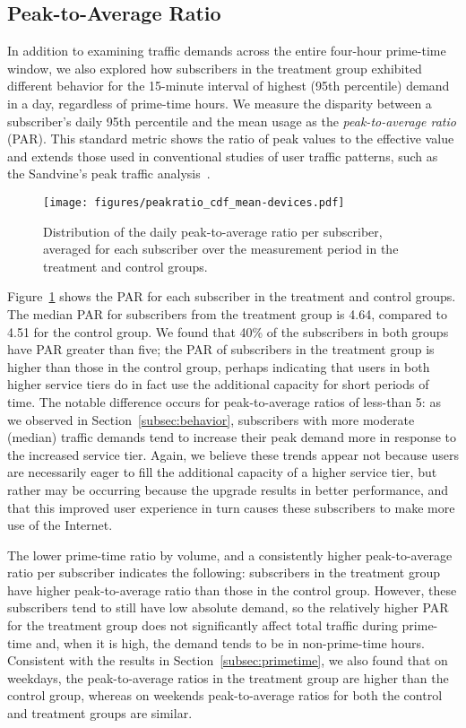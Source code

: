 \subsection{Peak-to-Average Ratio}\label{subsec:peakratio}

In addition to examining traffic demands across the entire four-hour
prime-time window, we also explored how subscribers in the treatment
group exhibited different behavior for the 15-minute interval of highest (95th percentile)
demand in a day, regardless of prime-time hours. We measure the disparity
between a subscriber's daily 95th percentile and 
the mean usage as the \emph{peak-to-average ratio}
(PAR). This standard metric
shows the ratio of peak values to the effective value and extends those used
in conventional studies of user traffic patterns, such as the Sandvine's
peak traffic analysis~\cite{sandvine20141h}. 

\begin{figure}[t]
\centering
\texttt{[image: figures/peakratio\_cdf\_mean-devices.pdf]}
\caption{Distribution of the daily peak-to-average ratio per subscriber, averaged for each subscriber over the measurement period in the treatment and  control groups.}
\label{fig:CDF-peak-ratio-mean}
\end{figure}

Figure~\ref{fig:CDF-peak-ratio-mean} shows the PAR for each 
subscriber in the treatment and control groups. The median PAR
 for subscribers from the treatment group is 4.64, compared to 4.51
for the control group.
We found that 40\% of the subscribers in both groups have PAR
greater than five; the PAR of subscribers in the treatment group is higher than those in the
control group, perhaps indicating that users in both higher service tiers do
in fact use the additional capacity for short periods of time. The
notable difference occurs for peak-to-average ratios of less-than 5: as
we observed in Section~\ref{subsec:behavior}, subscribers with more
moderate (median) traffic demands tend to increase their peak demand more in
response to the increased service tier.  Again, we believe these trends
appear not because users are necessarily eager to fill the additional
capacity of a higher service tier, but rather may be occurring because the upgrade
results in better performance, and that this improved user experience in
turn causes these subscribers to make more use of the Internet.

The lower prime-time ratio by volume, and a consistently higher
peak-to-average ratio per subscriber indicates the following:
subscribers in the treatment group have higher peak-to-average ratio than
those in the control group. However, these subscribers tend to still have
low absolute demand, so the relatively higher PAR for the treatment group does not significantly affect total traffic during prime-time and, when it is high, the demand
tends to be in non-prime-time hours.  Consistent with the results in
Section~\ref{subsec:primetime}, we also found that on weekdays, the
peak-to-average ratios in the treatment group are higher than the control
group, whereas on weekends peak-to-average ratios for both the control and
treatment groups are similar. 
